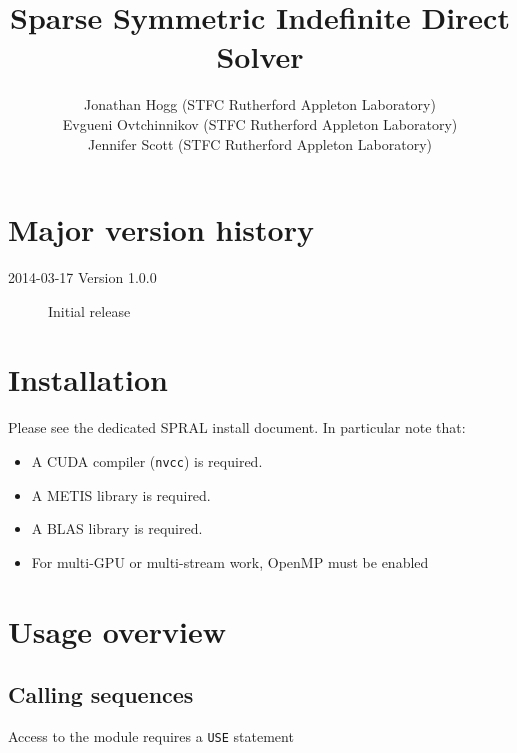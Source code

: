 \documentclass{spral}
\begin{document}
\title{Sparse Symmetric Indefinite Direct Solver}
\author{
   Jonathan Hogg (STFC Rutherford Appleton Laboratory) \\
   Evgueni Ovtchinnikov (STFC Rutherford Appleton Laboratory) \\
   Jennifer Scott (STFC Rutherford Appleton Laboratory)
}
\maketitle
\thispagestyle{firststyle}

\section*{Major version history}
\begin{description}
\item[2014-03-17 Version 1.0.0] Initial release
\end{description}


\section{Installation}
Please see the dedicated SPRAL install document. In particular note that:
\begin{itemize}
   \item A CUDA compiler (\texttt{nvcc}) is required.
   \item A METIS library is required.
   \item A BLAS library is required.
   \item For multi-GPU or multi-stream work, OpenMP must be enabled
\end{itemize}


\section{Usage overview}

\subsection{Calling sequences}

Access to the module requires a {\tt USE} statement \\ \\
\indent\hspace{8mm}{\tt use spral\_ssids} \\
\end{document}
